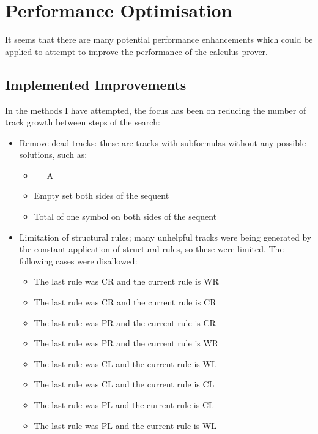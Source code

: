 \documentclass{article}
\begin{document}
\section{Performance Optimisation}

It seems that there are many potential performance enhancements which could be
applied to attempt to improve the performance of the calculus prover. 

\subsection{Implemented Improvements}

In the
methods I have attempted, the focus has been on reducing the number of track
growth between steps of the search:

\begin{itemize}
  \item Remove dead tracks: these are tracks with subformulas without any
  possible solutions, such as:
  \begin{itemize}
    \item $\vdash$ A
    \item Empty set both sides of the sequent
    \item Total of one symbol on both sides of the sequent
  \end{itemize}

  \item Limitation of structural rules; many unhelpful tracks were being generated by
  the constant application of structural rules, so these were limited. The
  following cases were disallowed:
  \begin{itemize}
    \item The last rule was CR and the current rule is WR
    \item The last rule was CR and the current rule is CR
    \item The last rule was PR and the current rule is CR
    \item The last rule was PR and the current rule is WR
    \item The last rule was CL and the current rule is WL
    \item The last rule was CL and the current rule is CL
    \item The last rule was PL and the current rule is CL
    \item The last rule was PL and the current rule is WL
  \end{itemize}
\end{itemize}
\end{document}
